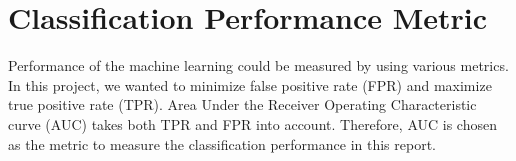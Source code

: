\section{Classification Performance Metric}
Performance of the machine learning could be measured by using various metrics. In this project, we wanted to minimize false positive rate (FPR) and maximize true positive rate (TPR). Area Under the Receiver Operating Characteristic curve (AUC) takes both TPR and FPR into account. Therefore, AUC is chosen as the metric to measure the classification performance in this report.